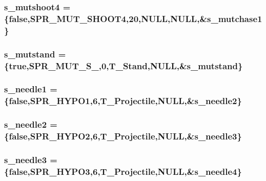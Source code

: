 \label{WL__ACT2_8C_a9573d4752c5dcfc9aadd50674ed38f54}
\hypertarget{WL__ACT2_8C_ab260f65f6ede523a2ccdab5d7426cb44}{
\subsubsection[{s\_\-mutshoot4}]{ {\bf s\_\-mutshoot4} = \{false,SPR\_\-MUT\_\-SHOOT4,20,NULL,NULL,\&{\bf s\_\-mutchase1}\}}}
\label{WL__ACT2_8C_ab260f65f6ede523a2ccdab5d7426cb44}
\hypertarget{WL__ACT2_8C_a5d0acd2bcbf9de6e39650dd74e3a46d7}{
\subsubsection[{s\_\-mutstand}]{ {\bf s\_\-mutstand} = \{true,SPR\_\-MUT\_\-S\_,0,T\_\-Stand,NULL,\&{\bf s\_\-mutstand}\}}}
\label{WL__ACT2_8C_a5d0acd2bcbf9de6e39650dd74e3a46d7}
\hypertarget{WL__ACT2_8C_a8bbf1638f0ed9842b39a992ee4e0f5b4}{
\subsubsection[{s\_\-needle1}]{ {\bf s\_\-needle1} = \{false,SPR\_\-HYPO1,6,T\_\-Projectile,NULL,\&{\bf s\_\-needle2}\}}}
\label{WL__ACT2_8C_a8bbf1638f0ed9842b39a992ee4e0f5b4}
\hypertarget{WL__ACT2_8C_abdffd4a4b451d90a8547c8cbf2c592cd}{
\subsubsection[{s\_\-needle2}]{ {\bf s\_\-needle2} = \{false,SPR\_\-HYPO2,6,T\_\-Projectile,NULL,\&{\bf s\_\-needle3}\}}}
\label{WL__ACT2_8C_abdffd4a4b451d90a8547c8cbf2c592cd}
\hypertarget{WL__ACT2_8C_a91077e051a1c5b8bdcd3a13bd34bf412}{
\subsubsection[{s\_\-needle3}]{ {\bf s\_\-needle3} = \{false,SPR\_\-HYPO3,6,T\_\-Projectile,NULL,\&{\bf s\_\-needle4}\}}}
